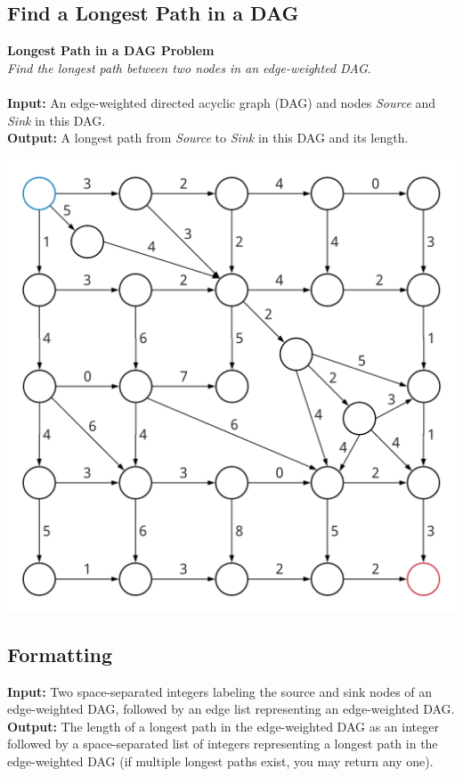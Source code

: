 \documentclass{article}
\begin{document}
\subsection{Find a Longest Path in a DAG}
\hline\vspace{5}
\textbf{Longest Path in a DAG Problem}\\
\emph{Find the longest path between two nodes in an edge-weighted DAG}.\\ \\
\textbf{Input:} An edge-weighted directed acyclic graph (DAG) and nodes \emph{Source} and \emph{Sink} in this DAG.\\
\textbf{Output:} A longest path from \emph{Source} to \emph{Sink} in this DAG and its length.
\begin{center}
    \includegraphics[scale=0.12]{c5/logos/5D.png}
\end{center}
\hline\vspace{5}

\subsection*{Formatting}
\noindent\textbf{Input:} Two space-separated integers labeling the source and sink nodes of an edge-weighted DAG, followed by an edge list representing an edge-weighted DAG.\\
\noindent\textbf{Output:} The length of a longest path in the edge-weighted DAG as an integer followed by a space-separated list of integers representing a longest path in the edge-weighted DAG (if multiple longest paths exist, you may return any one).
\end{document}
